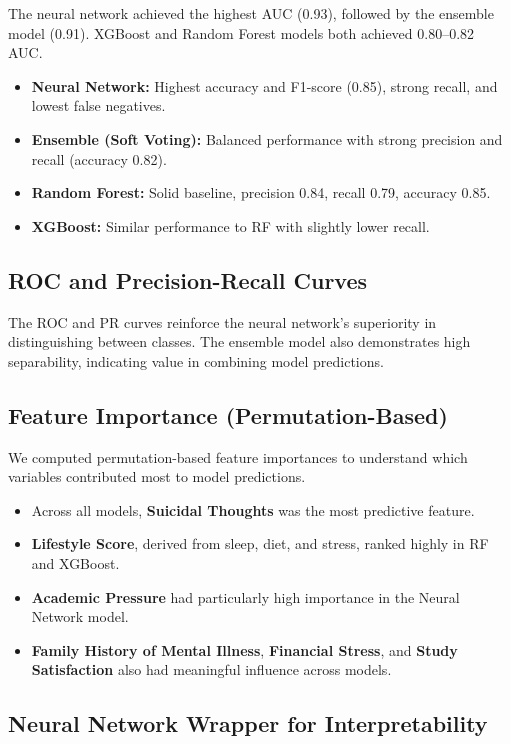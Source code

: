 \documentclass{article} %
\begin{document}
The neural network achieved the highest AUC (0.93), followed by the ensemble model (0.91). XGBoost and Random Forest models both achieved 0.80–0.82 AUC. 

\begin{itemize}
    \item \textbf{Neural Network:} Highest accuracy and F1-score (0.85), strong recall, and lowest false negatives.
    \item \textbf{Ensemble (Soft Voting):} Balanced performance with strong precision and recall (accuracy 0.82).
    \item \textbf{Random Forest:} Solid baseline, precision 0.84, recall 0.79, accuracy 0.85.
    \item \textbf{XGBoost:} Similar performance to RF with slightly lower recall.
\end{itemize}

\subsection*{ROC and Precision-Recall Curves}

The ROC and PR curves reinforce the neural network’s superiority in distinguishing between classes. The ensemble model also demonstrates high separability, indicating value in combining model predictions.

\subsection*{Feature Importance (Permutation-Based)}

We computed permutation-based feature importances to understand which variables contributed most to model predictions.

\begin{itemize}
    \item Across all models, \textbf{Suicidal Thoughts} was the most predictive feature.
    \item \textbf{Lifestyle Score}, derived from sleep, diet, and stress, ranked highly in RF and XGBoost.
    \item \textbf{Academic Pressure} had particularly high importance in the Neural Network model.
    \item \textbf{Family History of Mental Illness}, \textbf{Financial Stress}, and \textbf{Study Satisfaction} also had meaningful influence across models.
\end{itemize}

\subsection*{Neural Network Wrapper for Interpretability}
\end{document}
